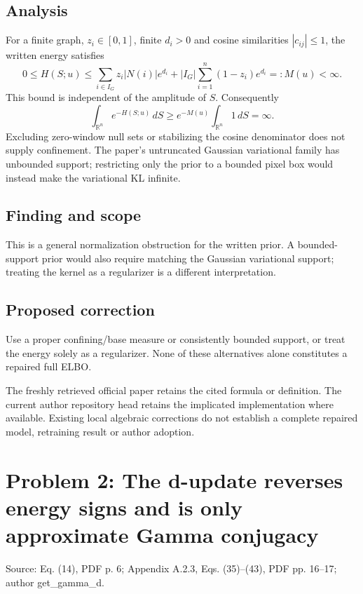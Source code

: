 \documentclass[11pt]{article}
\begin{document}
\subsection*{Analysis}

For a finite graph, \(z_i\in[0,1]\), finite \(d_i>0\) and cosine similarities \(|c_{ij}|\le1\), the written energy satisfies \[0\le H(S;u)\le\sum_{i\in I_G}z_i|N(i)|e^{d_i}+|I_G|\sum_{i=1}^n(1-z_i)e^{d_i}=:M(u)<\infty.\] This bound is independent of the amplitude of \(S\). Consequently \[\int_{\mathbb R^n}e^{-H(S;u)}\,dS\ge e^{-M(u)}\int_{\mathbb R^n}1\,dS=\infty.\] Excluding zero-window null sets or stabilizing the cosine denominator does not supply confinement. The paper’s untruncated Gaussian variational family has unbounded support; restricting only the prior to a bounded pixel box would instead make the variational KL infinite.

\subsection*{Finding and scope}

This is a general normalization obstruction for the written prior. A bounded-support prior would also require matching the Gaussian variational support; treating the kernel as a regularizer is a different interpretation.

\subsection*{Proposed correction}

Use a proper confining/base measure or consistently bounded support, or treat the energy solely as a regularizer. None of these alternatives alone constitutes a repaired full ELBO.

The freshly retrieved official paper retains the cited formula or definition. The current author repository head retains the implicated implementation where available. Existing local algebraic corrections do not establish a complete repaired model, retraining result or author adoption.

\section*{Problem 2: The d-update reverses energy signs and is only approximate Gamma conjugacy}

Source: Eq. (14), PDF p. 6; Appendix A.2.3, Eqs. (35)–(43), PDF pp. 16–17; author get\_gamma\_d.
\end{document}
